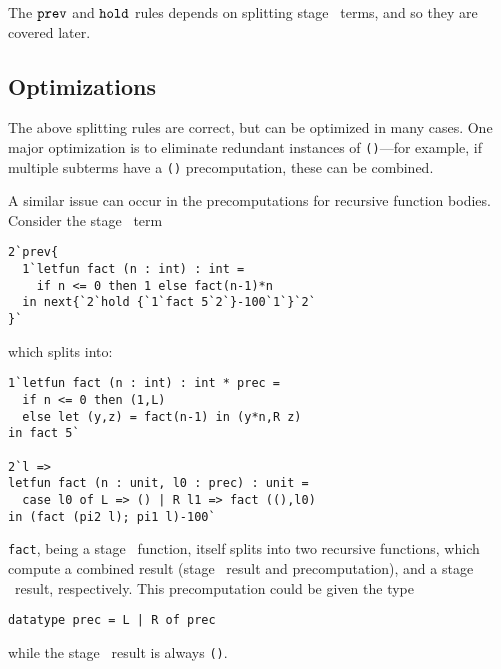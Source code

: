The ${\tt prev}$ and ${\tt hold}$ rules depends on
splitting stage \bbone\ terms, and so they are covered later.


%
%
%
%



\subsection{Optimizations}

The above splitting rules are correct, but can be optimized in many cases. One
major optimization is to eliminate redundant instances of \texttt{()}---for
example, if multiple subterms have a \texttt{()} precomputation, these can be
combined.

A similar issue can occur in the precomputations for recursive function bodies.
Consider the stage \bbtwo\ term
\begin{lstlisting}
2`prev{
  1`letfun fact (n : int) : int = 
    if n <= 0 then 1 else fact(n-1)*n
  in next{`2`hold {`1`fact 5`2`}-100`1`}`2`
}`
\end{lstlisting}
which splits into:
\begin{lstlisting}
1`letfun fact (n : int) : int * prec = 
  if n <= 0 then (1,L) 
  else let (y,z) = fact(n-1) in (y*n,R z)
in fact 5`

2`l => 
letfun fact (n : unit, l0 : prec) : unit = 
  case l0 of L => () | R l1 => fact ((),l0)
in (fact (pi2 l); pi1 l)-100`
\end{lstlisting}
\texttt{fact}, being a stage \bbone\ function, itself splits into two recursive
functions, which compute a combined result (stage \bbone\ result and
precomputation), and a stage \bbtwo\ result, respectively. This precomputation
could be given the type
\begin{lstlisting}
datatype prec = L | R of prec
\end{lstlisting}
while the stage \bbtwo\ result is always \texttt{()}.

